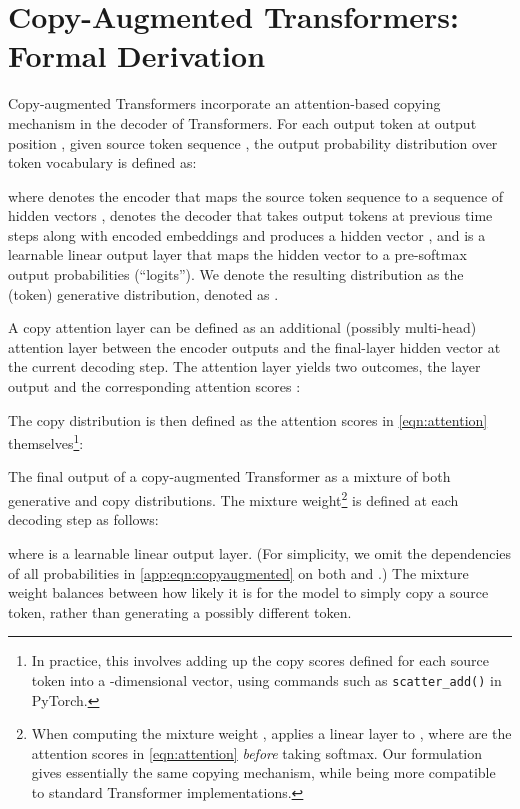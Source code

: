 \documentclass[11pt,a4paper]{article}
\begin{document}




\appendix

\section{Copy-Augmented Transformers: Formal Derivation}\label{app:copytransformer}

Copy-augmented Transformers \cite{zhao2019improving} incorporate an attention-based copying mechanism \cite{gu2016incorporating, see2017get, jia2016data} in the decoder of Transformers. 
For each output token  at output position , given source token sequence , the output probability distribution over token vocabulary  is defined as:

where  denotes the encoder that maps the source token sequence  to a sequence of hidden vectors ,  denotes the decoder that takes output tokens at previous time steps along with encoded embeddings and produces a hidden vector , and  is a learnable linear output layer that maps the hidden vector to a pre-softmax output probabilities (``logits'').
We denote the resulting distribution as the (token) generative distribution, denoted as .

A copy attention layer can be defined as an additional (possibly multi-head) attention layer between the encoder outputs and the final-layer hidden vector at the current decoding step.
The attention layer yields two outcomes, the layer output  and the corresponding attention scores :

The copy distribution is then defined as the attention scores in \eqref{eqn:attention} themselves\footnote{In practice, this involves adding up the copy scores defined for each source token into a -dimensional vector, using commands such as \texttt{scatter\_add()} in PyTorch.}:


The final output of a copy-augmented Transformer as a mixture of both generative and copy distributions.
The mixture weight\footnote{When computing the mixture weight , \citet{zhao2019improving} applies a linear layer to , where  are the attention scores in \eqref{eqn:attention} \textit{before} taking softmax. 
Our formulation gives essentially the same copying mechanism, while being more compatible to standard Transformer implementations.}  is defined at each decoding step as follows:

where  is a learnable linear output layer. 
(For simplicity, we omit the dependencies of all probabilities in \eqref{app:eqn:copyaugmented} on both  and .)
The mixture weight balances between how likely it is for the model to simply copy a source token, rather than generating a possibly different token.
\end{document}
